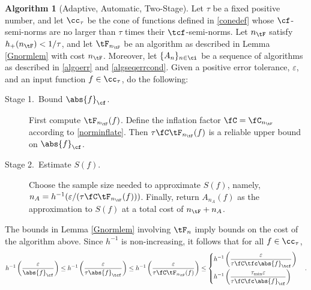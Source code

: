 \documentclass[]{elsarticle}
\theoremstyle{definition}
\newtheorem{algo}{Algorithm}
\theoremstyle{remark}
\newcommand{\Fnorm}[1]{\abs{#1}_{\cf}}
\newcommand{\Ftnorm}[1]{\abs{#1}_{\tcf}}
\begin{document}
\begin{algo}[Adaptive, Automatic, Two-Stage] \label{twostagedetalgo} Let $\tau$ be a fixed positive number, and let $\cc_\tau$ be the cone of functions defined in \eqref{conedef} whose $\cf$-semi-norms are no larger than $\tau$ times their $\tcf$-semi-norms.  Let $n_{\tF}$ satisfy $h_{+}(n_{\tF}) < 1/\tau$, and let $\tF_{n_{\tF}}$ be an algorithm as described in Lemma \ref{Gnormlem} with cost $n_{\tF}$.
Moreover, let  $\{A_n\}_{n \in \ci}$ be a sequence of algorithms as described in \eqref{algoerr} and \eqref{algseqerrcond}.  Given  a positive error tolerance, $\varepsilon$, and  an input function $f \in \cc_{\tau}$, do the following:

\begin{description} 

\item[Stage 1.\ Bound {$\Fnorm{f}$}.] First compute $\tF_{n_{\tF}}(f)$.  Define the inflation factor $\fC=\fC_{n_{\tF}}$ according to \eqref{norminflate}.
Then $\tau \fC \tF_{n_{\tF}}(f)$ is a reliable upper bound on $\Fnorm{f}$.  

\item [Stage 2.\ Estimate {$S(f)$}.] Choose the sample size needed to approximate $S(f)$, namely, $n_A=h^{-1}(\varepsilon/(\tau\fC \tF_{n_{\tF}}(f)))$.  Finally, return $A_{n_A}(f)$ as the approximation to $S(f)$ at a total cost of $n_{\tF}+n_A$. 
\end{description}
\end{algo}

The bounds in Lemma \ref{Gnormlem} involving $\tF_n$ imply bounds on the cost of the algorithm above.  Since $h^{-1}$ is non-increasing, it follows that for all $f \in \cc_{\tau}$,
\begin{equation*}
h^{-1}\left(\frac{\varepsilon}{\Fnorm{f}}\right) \le  h^{-1}\left(\frac{\varepsilon}{\tau\Ftnorm{f}}\right)  \le h^{-1}\left(\frac{\varepsilon}{\tau \fC \tF_{n_{\tF}}(f)}\right) \le 
\begin{cases} \displaystyle  h^{-1}\left(\frac{\varepsilon}{\tau \fC \tfc \Ftnorm{f}}\right) \\[2ex]
\displaystyle  h^{-1}\left(\frac{\tau_{\min} \varepsilon}{\tau \fC \fc \Fnorm{f}}\right)\end{cases}.
\end{equation*}
\end{document}
